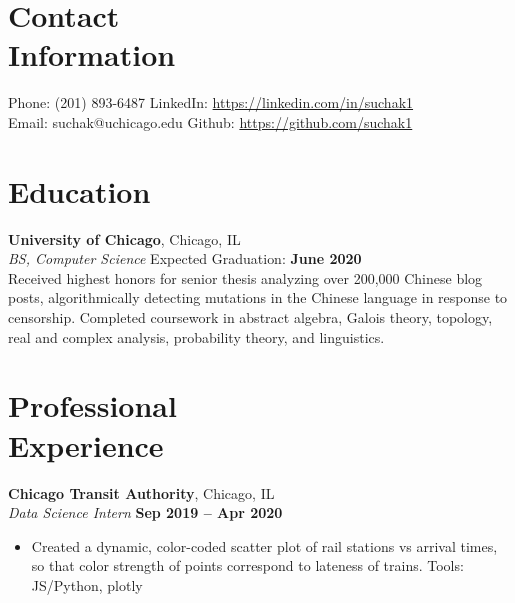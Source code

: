 \documentclass[margin,line]{resume}
\begin{document}
\begin{resume}
    \section{\mysidestyle Contact\\Information}

    Phone: (201) 893-6487       \hfill LinkedIn: \url{https://linkedin.com/in/suchak1} \\
    \noindent Email: suchak@uchicago.edu  \hfill Github: \url{https://github.com/suchak1} \vspace{0mm}\\\vspace{-4.5mm}

    \section{\mysidestyle Education}

    \textbf{University of Chicago}, Chicago, IL \vspace{2mm}\\\vspace{1mm}%
    \textsl{BS, Computer Science} \hfill Expected Graduation: \textbf{June 2020}\\
    Received highest honors for senior thesis analyzing over 200,000 Chinese
    blog posts, algorithmically detecting mutations in the Chinese language in
    response to censorship. Completed coursework in abstract algebra,
    Galois theory, topology, real and complex analysis, probability theory, and
    linguistics.

    \section{\mysidestyle Professional\\Experience}

    \textbf{Chicago Transit Authority}, Chicago, IL \vspace{2mm}\\\vspace{1mm}%
    \textsl{Data Science Intern} \hfill \textbf{Sep 2019 -- Apr 2020}

    \begin{itemize}
\item Created a dynamic, color-coded scatter plot  of rail stations vs arrival times, so that color strength of points correspond to lateness of trains. \hfill Tools: JS/Python, plotly


\end{itemize}
\end{resume}
\end{document}
